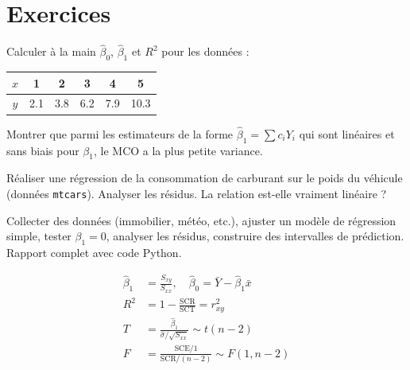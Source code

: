 \section{Exercices}

\begin{exercice}
Calculer \`a la main $\hat{\beta}_0$, $\hat{\beta}_1$ et $R^2$ pour les donn\'ees :
\begin{center}
\begin{tabular}{c|ccccc}
$x$ & 1 & 2 & 3 & 4 & 5 \\
\hline
$y$ & 2.1 & 3.8 & 6.2 & 7.9 & 10.3 \\
\end{tabular}
\end{center}
\end{exercice}

\begin{exercice}
Montrer que parmi les estimateurs de la forme $\hat{\beta}_1=\sum c_i Y_i$ qui sont lin\'eaires et sans biais pour $\beta_1$, le MCO a la plus petite variance.
\end{exercice}

\begin{exercice}
R\'ealiser une r\'egression de la consommation de carburant sur le poids du v\'ehicule (donn\'ees \texttt{mtcars}). Analyser les r\'esidus. La relation est-elle vraiment lin\'eaire ?
\end{exercice}

\begin{exercice}
Collecter des donn\'ees (immobilier, m\'et\'eo, etc.), ajuster un mod\`ele de r\'egression simple, tester $\beta_1=0$, analyser les r\'esidus, construire des intervalles de pr\'ediction. Rapport complet avec code Python.
\end{exercice}

\begin{formules}
\begin{align*}
\hat{\beta}_1 &= \frac{S_{xy}}{S_{xx}}, \quad \hat{\beta}_0=\bar{Y}-\hat{\beta}_1\bar{x} \\
R^2 &= 1-\frac{\mathrm{SCR}}{\mathrm{SCT}} = r_{xy}^2 \\
T &= \frac{\hat{\beta}_1}{\hat{\sigma}/\sqrt{S_{xx}}} \sim t(n-2) \\
F &= \frac{\mathrm{SCE}/1}{\mathrm{SCR}/(n-2)} \sim F(1,n-2)
\end{align*}
\end{formules}
